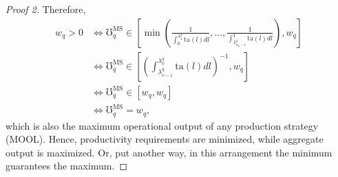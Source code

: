 \documentclass[hidelinks, nonatbib]{elsarticle}
\begin{document}
\begin{lemma}
\begin{proof}[Proof 2]
        Therefore,
        \begin{align}
            w_q > 0
            &\iff
            \mho_{q}^{\text{MS}}
            \in
            \left[
                \min\left(
                    \frac{1}{
                        \int_{0}^{
                            \lambda_{1}^{q}
                        }{
                            \text{ta}(l)dl
                        }
                    }
                    ,
                    \dots
                    ,
                    \frac{1}{
                        \int_{
                            \lambda_{w_q - 1}^{q}
                        }^{1}{
                            \text{ta}(l)dl
                        }
                    }
                \right)
                ,
                w_q
            \right]
            \\
            &\iff
            \mho_{q}^{\text{MS}}
            \in
            \left[
                \left(
                    \int_{
                        \lambda_{v-1}^{q}
                    }^{
                        \lambda_{v}^{q}
                    }{
                        \text{ta}(l)dl
                    }
                \right) ^ {-1}
                ,
                w_q
            \right]
            \\
            &\iff
            \mho_{q}^{\text{MS}}
            \in
            \left[
                w_q
                ,
                w_q
            \right]
            \\
            &\iff
            \mho_{q}^{\text{MS}}
            =
            w_q
            ,
        \end{align}
        which is also the maximum operational output of any production strategy (MOOL). Hence, productivity requirements are minimized, while aggregate output is maximized. Or, put another way, in this arrangement the minimum guarantees the maximum.
    \end{proof}
\end{lemma}
\end{document}
